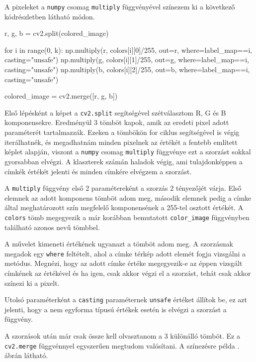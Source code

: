 A pixeleket a \texttt{numpy} csomag \texttt{multiply} függvényével színezem ki a következő kódrészletben látható módon.

\begin{python}
r, g, b = cv2.split(colored_image)

for i in range(0, k):
    np.multiply(r, colors[i][0]/255, out=r,
                where=label_map==i, casting="unsafe")
    np.multiply(g, colors[i][1]/255, out=g,
                where=label_map==i, casting="unsafe")
    np.multiply(b, colors[i][2]/255, out=b,
                where=label_map==i, casting="unsafe")

colored_image = cv2.merge([r, g, b])
\end{python}

Első lépésként a képet a \texttt{cv2.split} segítségével szétválasztom R, G és B komponensekre. Eredményül 3 tömböt kapok, amik az eredeti pixel adott paraméterét tartalmazzák. Ezeken a tömbökön for ciklus segítségével is végig iterálhatnék, és megadhatnám minden pixelnek az értékét a fentebb említett képlet alapján, viszont a \texttt{numpy} csomag \texttt{multiply} függvénye ezt a szorzást sokkal gyorsabban elvégzi. A klaszterek számán haladok végig, ami tulajdonképpen a címkék értékét jelenti és minden címkére elvégzem a szorzást.

A \texttt{multiply} függvény első 2 paramétereként a szorzás 2 tényezőjét várja. Első elemnek az adott komponens tömböt adom meg, második elemnek pedig a címke által meghatározott szín megfelelő komponensének a 255-tel osztott értékét. A \texttt{colors} tömb megegyezik a már korábban bemutatott \texttt{color\_image} függvényben található azonos nevű tömbbel.

A művelet kimeneti értékének ugyanazt a tömböt adom meg. A szorzásnak megadok egy \texttt{where} feltételt, ahol a címke térkép adott elemét fogja vizsgálni a metódus. Megnézi, hogy az adott címke értéke megegyezik-e az éppen vizsgált címkének az értékével és ha igen, csak akkor végzi el a szorzást, tehát csak akkor színezi ki a pixelt.

Utolsó paraméterként a \texttt{casting} paraméternek \texttt{unsafe} értéket állítok be, ez azt jelenti, hogy a nem egyforma típusú értékek esetén is elvégzi a szorzást a függvény.

A szorzások után már csak össze kell olvasztanom a 3 különálló tömböt. Ez a \texttt{cv2.merge} függvénnyel egyszerűen megtudom valósítani. A színezésre példa . ábrán látható.

